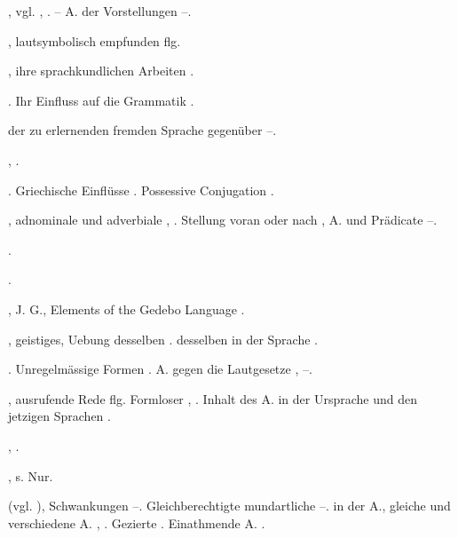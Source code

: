 \begin{register}
, vgl. , . – A. der Vorstellungen \pageref{sp.43}–\pageref{sp.44}.

, lautsymbolisch empfunden \pageref{sp.220} flg.


, ihre sprachkundlichen Arbeiten \pageref{sp.18}.

. Ihr Einfluss auf die Grammatik \pageref{sp.95}.

 der zu erlernenden fremden Sprache gegenüber \pageref{sp.83}–\pageref{sp.84}.

 \pageref{sp.405}, \pageref{sp.423}.

.  Griechische Einflüsse \pageref{sp.272}. Possessive Conjugation \pageref{sp.391}.


, adnominale und adverbiale \pageref{sp.101}, \pageref{sp.462}. Stellung voran oder nach \pageref{sp.149}, A. und Prädicate \pageref{sp.451}–\pageref{sp.459}.

 \pageref{sp.458}.

 \pageref{sp.103}.

, J. G., Elements of the Gedebo Language \pageref{sp.379}.

, geistiges, Uebung desselben \pageref{sp.32}.  desselben in der Sprache \pageref{sp.325}.



. Unregelmässige Formen \pageref{sp.64}. A. gegen die Lautgesetze \pageref{sp.141}, \pageref{sp.187}–\pageref{sp.209}.

, ausrufende Rede \pageref{sp.319} flg. Formloser \pageref{sp.345}, \pageref{sp.360}. Inhalt des A. in der Ursprache und den jetzigen Sprachen \pageref{sp.349}.

 \pageref{sp.103}, \pageref{sp.321}.

, s. Nur.

 (vgl. ), Schwankungen \pageref{sp.33}–\pageref{sp.34}. Gleichberechtigte mundartliche \pageref{sp.125}–\pageref{sp.126}.  in der A., gleiche und verschiedene A. \pageref{sp.184}, \pageref{sp.245}. Gezierte \pageref{sp.187}. Einathmende A. \pageref{sp.225}.


\end{register}
